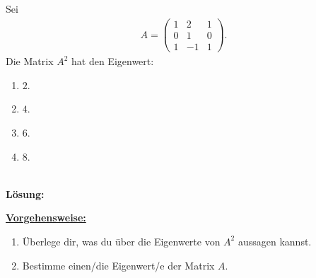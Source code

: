 \subsection*{}
Sei
\begin{align*}
A
=
\begin{pmatrix}
1 & 2 & 1\\
0 & 1 & 0\\
1 & -1 & 1
\end{pmatrix}.
\end{align*}
Die Matrix $ A^2 $ hat den Eigenwert:
\renewcommand{\labelenumi}{(\alph{enumi})}
\begin{enumerate}
	\item 
	$ 2 $.
	\item
	$ 4 $.
	\item
	$ 6 $.
	\item
	$ 8 $.
\end{enumerate}
\ \\
\textbf{Lösung:}
\begin{mdframed}
\underline{\textbf{Vorgehensweise:}}
\renewcommand{\labelenumi}{\theenumi.}
\begin{enumerate}
\item Überlege dir, was du über die Eigenwerte von $ A^2 $ aussagen kannst.
\item Bestimme einen/die Eigenwert/e der Matrix $ A $.
\end{enumerate}
\end{mdframed}

